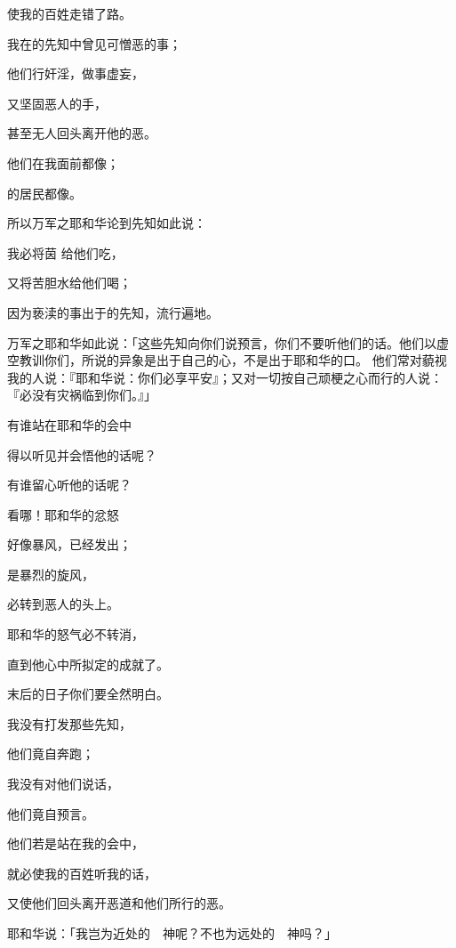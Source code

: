 {\par }{\Q 使我的百姓{}走错了路。
\par }{\Q {}我在{}的先知中曾见可憎恶的事；
\par }{\Q 他们行奸淫，做事虚妄，
\par }{\Q 又坚固恶人的手，
\par }{\Q 甚至无人回头离开他的恶。
\par }{\Q 他们在我面前都像{}；
\par }{的居民都像{}。
\par }{\Q {}所以万军之耶和华论到先知如此说：
\par }{\Q 我必将茵 给他们吃，
\par }{\Q 又将苦胆水给他们喝；
\par }{\Q 因为亵渎的事出于{}的先知，流行遍地。
\par }{\PP {}万军之耶和华如此说：「这些先知向你们说预言，你们不要听他们的话。他们以虚空教训你们，所说的异象是出于自己的心，不是出于耶和华的口。
他们常对藐视我的人说：『耶和华说：你们必享平安』；又对一切按自己顽梗之心而行的人说：『必没有灾祸临到你们。』」
\par }{\Q {}有谁站在耶和华的会中
\par }{\Q 得以听见并会悟他的话呢？
\par }{\Q 有谁留心听他的话呢？
\par }{\Q {}看哪！耶和华的忿怒
\par }{\Q 好像暴风，已经发出；
\par }{\Q 是暴烈的旋风，
\par }{\Q 必转到恶人的头上。
\par }{\Q {}耶和华的怒气必不转消，
\par }{\Q 直到他心中所拟定的成就了。
\par }{\Q 末后的日子你们要全然明白。
\par }{\BB \par }{\Q {}我没有打发那些先知，
\par }{\Q 他们竟自奔跑；
\par }{\Q 我没有对他们说话，
\par }{\Q 他们竟自预言。
\par }{\Q {}他们若是站在我的会中，
\par }{\Q 就必使我的百姓听我的话，
\par }{\Q 又使他们回头离开恶道和他们所行的恶。
\par }{\PP {}耶和华说：「我岂为近处的　神呢？不也为远处的　神吗？」
}
